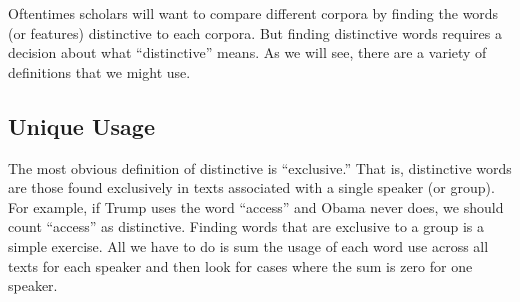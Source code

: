 \documentclass[
]{book}
\begin{document}
Oftentimes scholars will want to compare different corpora by finding the words (or features) distinctive to each corpora. But finding distinctive words requires a decision about what ``distinctive'' means. As we will see, there are a variety of definitions that we might use.

\hypertarget{unique-usage}{%
\subsection{Unique Usage}\label{unique-usage}}

The most obvious definition of distinctive is ``exclusive.'' That is, distinctive words are those found exclusively in texts associated with a single speaker (or group). For example, if Trump uses the word ``access'' and Obama never does, we should count ``access'' as distinctive.
Finding words that are exclusive to a group is a simple exercise. All we have to do is sum the usage of each word use across all texts for each speaker and then look for cases where the sum is zero for one speaker.
\end{document}
